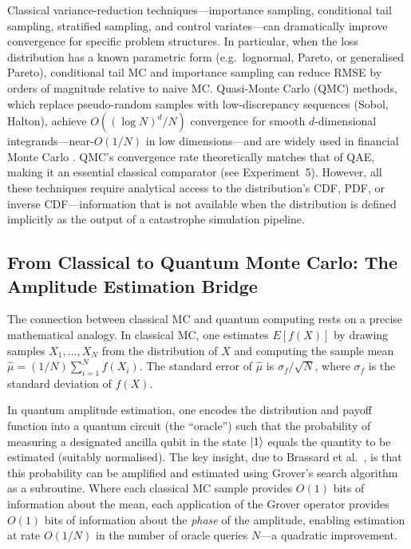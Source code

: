 \documentclass[11pt,a4paper]{article}
\begin{document}
Classical variance-reduction techniques---importance sampling, conditional tail sampling, stratified sampling, and control variates---can dramatically improve convergence for specific problem structures. In particular, when the loss distribution has a known parametric form (e.g.\ lognormal, Pareto, or generalised Pareto), conditional tail MC and importance sampling can reduce RMSE by orders of magnitude relative to naive MC. Quasi-Monte Carlo (QMC) methods, which replace pseudo-random samples with low-discrepancy sequences (Sobol, Halton), achieve $O((\log N)^d/N)$ convergence for smooth $d$-dimensional integrands---near-$O(1/N)$ in low dimensions---and are widely used in financial Monte Carlo \cite{Glasserman2003}. QMC's convergence rate theoretically matches that of QAE, making it an essential classical comparator (see Experiment~5). However, all these techniques require analytical access to the distribution's CDF, PDF, or inverse CDF---information that is not available when the distribution is defined implicitly as the output of a catastrophe simulation pipeline.

\subsection{From Classical to Quantum Monte Carlo: The Amplitude Estimation Bridge}

The connection between classical MC and quantum computing rests on a precise mathematical analogy. In classical MC, one estimates $E[f(X)]$ by drawing samples $X_1, \ldots, X_N$ from the distribution of $X$ and computing the sample mean $\hat{\mu} = (1/N) \sum_{i=1}^{N} f(X_i)$. The standard error of $\hat{\mu}$ is $\sigma_f / \sqrt{N}$, where $\sigma_f$ is the standard deviation of $f(X)$.

In quantum amplitude estimation, one encodes the distribution and payoff function into a quantum circuit (the ``oracle'') such that the probability of measuring a designated ancilla qubit in the state $\ket{1}$ equals the quantity to be estimated (suitably normalised). The key insight, due to Brassard et al.\ \cite{Brassard2002}, is that this probability can be amplified and estimated using Grover's search algorithm \cite{Grover1996} as a subroutine. Where each classical MC sample provides $O(1)$ bits of information about the mean, each application of the Grover operator provides $O(1)$ bits of information about the \emph{phase} of the amplitude, enabling estimation at rate $O(1/N)$ in the number of oracle queries $N$---a quadratic improvement.
\end{document}
